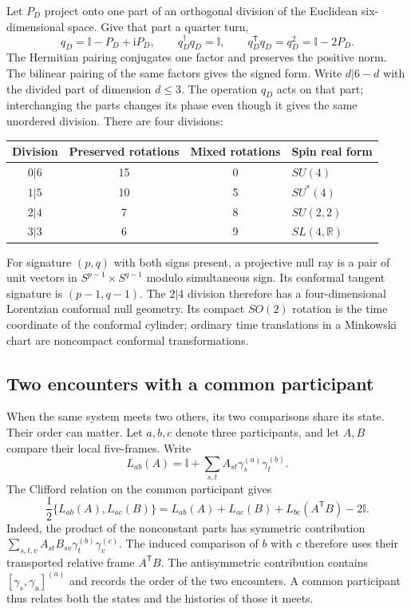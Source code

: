 \documentclass[aps,prx,onecolumn,10pt,notitlepage,nofootinbib,longbibliography]{revtex4-2}
\numberwithin{equation}{section}
\numberwithin{table}{section}
\newcommand{\Id}{\mathbb I}
\newcommand{\RR}{\mathbb R}
\newcommand{\ii}{\mathrm i}
\begin{document}
Let $P_D$ project onto one part of an orthogonal division of the Euclidean six-dimensional space. Give that part a quarter turn,
\begin{equation}
 q_D=\Id-P_D+\ii P_D,\qquad
 q_D^\dagger q_D=\Id,\qquad
 q_D^{\mathsf T}q_D=q_D^2=\Id-2P_D.
 \label{eq:divisionroot}
\end{equation}
The Hermitian pairing conjugates one factor and preserves the positive norm. The bilinear pairing of the same factors gives the signed form. Write $d|6-d$ with the divided part of dimension $d\leq3$. The operation $q_D$ acts on that part; interchanging the parts changes its phase even though it gives the same unordered division. There are four divisions:
\begin{center}
\begin{tabular}{cccl}
\toprule
Division&Preserved rotations&Mixed rotations&Spin real form\\\midrule
$0|6$&15&0&$SU(4)$\\
$1|5$&10&5&$SU^*(4)$\\
$2|4$&7&8&$SU(2,2)$\\
$3|3$&6&9&$SL(4,\RR)$\\\bottomrule
\end{tabular}
\end{center}
For signature $(p,q)$ with both signs present, a projective null ray is a pair of unit vectors in $S^{p-1}\times S^{q-1}$ modulo simultaneous sign. Its conformal tangent signature is $(p-1,q-1)$. The $2|4$ division therefore has a four-dimensional Lorentzian conformal null geometry. Its compact $SO(2)$ rotation is the time coordinate of the conformal cylinder; ordinary time translations in a Minkowski chart are noncompact conformal transformations.

\subsection{Two encounters with a common participant}
When the same system meets two others, its two comparisons share its state. Their order can matter. Let $a,b,c$ denote three participants, and let $A,B$ compare their local five-frames. Write
\begin{equation}
 L_{ab}(A)=\Id+\sum_{s,t}A_{st}\gamma_s^{(a)}\gamma_t^{(b)}.
\end{equation}
The Clifford relation on the common participant gives
\begin{equation}
 \frac12\{L_{ab}(A),L_{ac}(B)\}
 =L_{ab}(A)+L_{ac}(B)+L_{bc}(A^{\mathsf T}B)-2\Id.
 \label{eq:threeparticipants}
\end{equation}
Indeed, the product of the nonconstant parts has symmetric contribution
$\sum_{s,t,v}A_{st}B_{sv}\gamma_t^{(b)}\gamma_v^{(c)}$.
The induced comparison of $b$ with $c$ therefore uses their transported relative frame $A^{\mathsf T}B$. The antisymmetric contribution contains $[\gamma_s,\gamma_u]^{(a)}$ and records the order of the two encounters. A common participant thus relates both the states and the histories of those it meets.
\end{document}
